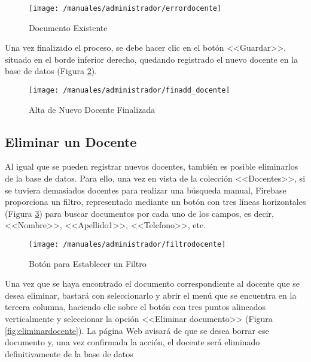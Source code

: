 \begin{figure}[!h]
	\begin{center}
		\texttt{[image: /manuales/administrador/errordocente]}
		\caption{Documento Existente}
		\label{fig:errordocente}
	\end{center}
\end{figure}

Una vez finalizado el proceso, se debe hacer clic en el botón <<Guardar>>, situado en el borde inferior derecho, quedando registrado el nuevo docente en la base de datos (Figura \ref{fig:finadddocente}).

\begin{figure}[!h]
	\begin{center}
		\texttt{[image: /manuales/administrador/finadd\_docente]}
		\caption{Alta de Nuevo Docente Finalizada}
		\label{fig:finadddocente}
	\end{center}
\end{figure}

\subsection*{Eliminar un Docente}
Al igual que se pueden registrar nuevos docentes, también es posible eliminarlos de la base de datos. Para ello, una vez en vista de la colección <<Docentes>>, si se tuviera demasiados docentes para realizar una búsqueda manual, Firebase proporciona un filtro, representado mediante un botón con tres líneas horizontales (Figura \ref{fig:filtrodocente}) para buscar documentos por cada uno de los campos, es decir, <<Nombre>>, <<Apellido1>>, <<Telefono>>, etc.

\begin{figure}[!h]
	\begin{center}
		\texttt{[image: /manuales/administrador/filtrodocente]}
		\caption{Botón para Establecer un Filtro}
		\label{fig:filtrodocente}
	\end{center}
\end{figure}

\clearpage

Una vez que se haya encontrado el documento correspondiente al docente que se desea eliminar, bastará con seleccionarlo y abrir el menú que se encuentra en la tercera columna, haciendo clic sobre el botón con tres puntos alineados verticalmente y seleccionar la opción <<Eliminar documento>> (Figura \ref{fig:eliminardocente}). La página Web avisará de que se desea borrar ese documento y, una vez confirmada la acción, el docente será eliminado definitivamente de la base de datos

